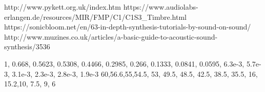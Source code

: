 


http://www.pykett.org.uk/index.htm
https://www.audiolabs-erlangen.de/resources/MIR/FMP/C1/C1S3_Timbre.html
https://sonicbloom.net/en/63-in-depth-synthesis-tutorials-by-sound-on-sound/
http://www.muzines.co.uk/articles/a-basic-guide-to-acoustic-sound-synthesis/3536

1, 0.668, 0.5623, 0.5308, 0.4466, 0.2985, 0.266, 0.1333, 0.0841, 0.0595, 6.3e-3, 5.7e-3, 3.1e-3, 2.3e-3, 2.8e-3, 1.9e-3
60,56.6,55,54.5, 53, 49.5, 48.5, 42.5, 38.5, 35.5, 16, 15.2,10, 7.5, 9, 6
